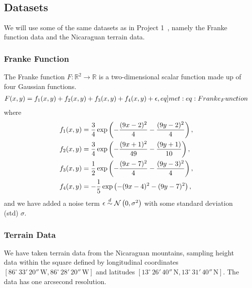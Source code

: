 \\
\subsection{Datasets}
    We will use some of the same datasets as in Project 1~\citep{Project1}, namely the Franke function data and the Nicaraguan terrain data.
    \subsubsection{Franke Function}
        The Franke function $F: \mathbb{R}^2 \to \mathbb{R}$ is a two-dimensional scalar function made up of four Gaussian functions.
        \begin{align}
            F(x,y) = f_1(x,y) + f_2(x,y) + f_3(x,y) + f_4(x,y) + \epsilon, \label[eq]{met:eq:Franke_Function}
        \end{align}
        where
        \begin{subequations}
            \begin{align}
                f_1(x,y) &= \frac{3}{4}\operatorname{exp}\left( -\frac{(9x-2)^2}{4} - \frac{(9y-2)^2}{4} \right), \\
                f_2(x,y) &= \frac{3}{4}\operatorname{exp}\left( -\frac{(9x+1)^2}{49} - \frac{(9y+1)}{10} \right), \\
                f_3(x,y) &= \frac{1}{2}\operatorname{exp}\left( -\frac{(9x-7)^2}{4} - \frac{(9y-3)^2}{4} \right), \\
                f_4(x,y) &= -\frac{1}{5}\operatorname{exp}\left( -(9x-4)^2 - (9y-7)^2 \right),
            \end{align}
        \end{subequations}
        and we have added a noise term $\epsilon \overset{d}{\sim} \operatorname{\mathcal{N}}\left(0,\sigma^2\right)$ with some standard deviation (std) $\sigma$.

    \subsubsection{Terrain Data}
        We have taken terrain data from the Nicaraguan mountains, sampling height data within the square defined by longitudinal coordinates $[86^\circ\,33'\,20''\,\text{W}, 86^\circ\,28'\,20''\,\text{W}]$ and latitudes $[13^\circ\,26'\,40''\,\text{N}, 13^\circ\,31'\,40''\,\text{N}]$. The data has one arcsecond resolution.

